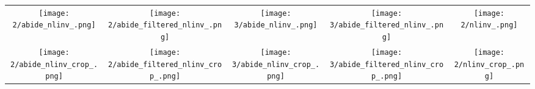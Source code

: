 \begin{tabular}{c @{\hskip 0pt} c @{\hskip 0pt} c @{\hskip 0pt} c @{\hskip 0pt}c }
    \texttt{[image: 2/abide\_nlinv\_.png]}&
    \texttt{[image: 2/abide\_filtered\_nlinv\_.png]}&
    \texttt{[image: 3/abide\_nlinv\_.png]}&
    \texttt{[image: 3/abide\_filtered\_nlinv\_.png]}&
    \texttt{[image: 2/nlinv\_.png]}\\
    \texttt{[image: 2/abide\_nlinv\_crop\_.png]}&
    \texttt{[image: 2/abide\_filtered\_nlinv\_crop\_.png]}&
    \texttt{[image: 3/abide\_nlinv\_crop\_.png]}&
    \texttt{[image: 3/abide\_filtered\_nlinv\_crop\_.png]}&
    \texttt{[image: 2/nlinv\_crop\_.png]}
\end{tabular}